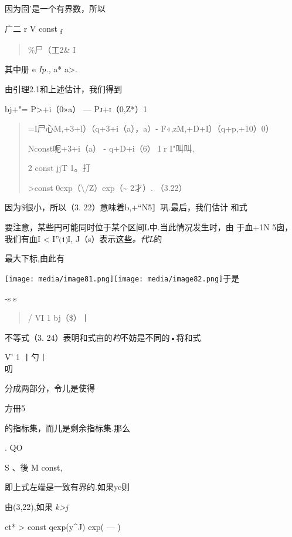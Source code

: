 \documentclass{article}
\begin{document}
因为囹'是一个有界数，所以

广二 r V const \textsubscript{f}

\begin{quote}
\textbar{}\%尸（工2\& I
\end{quote}

其中册 e \emph{Ip.,} a* a\textgreater{}.

由引理2.1和上述估计，我们得到

\textbar{}bj+"= \textbar{}P\textgreater{}+i（0»a） ---
\textsc{Pj+i（0,Z*）1}

\begin{quote}
=I尸心M,+3+l）（q+3+i（a），a）- F«,zM,+D+I）（q+p,+10）0）\textbar{}

Nconst呢+3+i（a） - q+D+i（6） I r {I"叫叫},

2 const jjT 1。打

\textgreater{}const
0\textbar{}exp（\textbackslash{}/Z）exp（\textasciitilde{} 2才）.
（3.22）
\end{quote}

因为\$很小，所以（3. 22）意味着\textbar{}b,+``N5］巩.最后，我们估计 和式

要注意，某些円可能同时位于某个区间L中.当此情况发生时，由 于血+1N
5囱\textbar{}，我们有血I \textless{} I''⑴I, J（s）表示这些\emph{。代L}的

最大下标,由此有

\texttt{[image: media/image81.png]}\texttt{[image: media/image82.png]}于是

-s s

\begin{quote}
/ VI 1 \textbar{}bj（\$）丨
\end{quote}

不等式（3. 24）表明和式亩的\emph{杓}不妨是不同的•将和式

V' {1 丨勺丨\\
}叨

分成两部分，令儿是使得

方冊5

的指标集，而儿是剩余指标集.那么

. QO

S 、後 M const,

即上式左端是一致有界的.如果ye则

由(3,22),如果 \emph{k\textgreater{}j}

\textbar{}ct*\textbar{} \textgreater{} const
\textbar{}q\textbar{}exp(y\^{}J) exp( --- )
\end{document}
